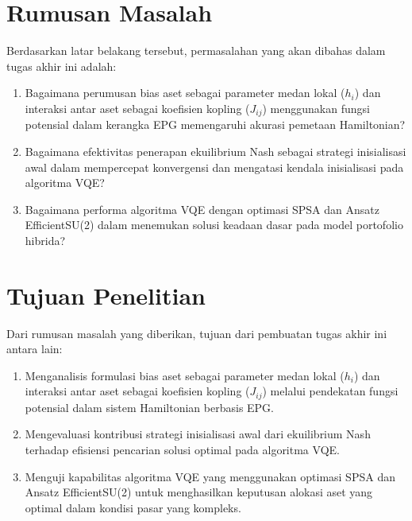 \section{Rumusan Masalah}
Berdasarkan latar belakang tersebut, permasalahan yang akan dibahas dalam tugas akhir ini adalah:
\begin{enumerate}
    \item Bagaimana perumusan bias aset sebagai parameter medan lokal ($h_i$) dan interaksi antar aset sebagai koefisien kopling ($J_{ij}$) menggunakan fungsi potensial dalam kerangka EPG memengaruhi akurasi pemetaan Hamiltonian?
    \item Bagaimana efektivitas penerapan ekuilibrium Nash sebagai strategi inisialisasi awal dalam mempercepat konvergensi dan mengatasi kendala inisialisasi pada algoritma VQE?
    \item Bagaimana performa algoritma VQE dengan optimasi SPSA dan Ansatz EfficientSU(2) dalam menemukan solusi keadaan dasar pada model portofolio hibrida?
\end{enumerate}

\section{Tujuan Penelitian}
Dari rumusan masalah yang diberikan, tujuan dari pembuatan tugas akhir ini antara lain:
\begin{enumerate}
    \item Menganalisis formulasi bias aset sebagai parameter medan lokal ($h_i$) dan interaksi antar aset sebagai koefisien kopling ($J_{ij}$) melalui pendekatan fungsi potensial dalam sistem Hamiltonian berbasis EPG.
    \item Mengevaluasi kontribusi strategi inisialisasi awal dari ekuilibrium Nash terhadap efisiensi pencarian solusi optimal pada algoritma VQE.
    \item Menguji kapabilitas algoritma VQE yang menggunakan optimasi SPSA dan Ansatz EfficientSU(2) untuk menghasilkan keputusan alokasi aset yang optimal dalam kondisi pasar yang kompleks.
\end{enumerate}

